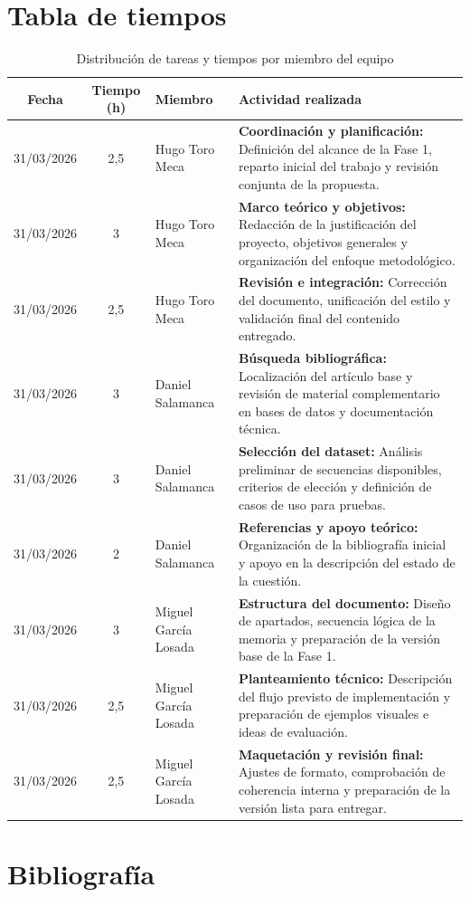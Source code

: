 \documentclass{article}
\begin{document}
\section{Tabla de tiempos}

\begin{table}[H] %
    \centering
    \small %
    \begin{tabular}{|c|c|l|p{8cm}|}
        \hline
        \textbf{Fecha} & \textbf{Tiempo (h)} & \textbf{Miembro} & \textbf{Actividad realizada} \\ \hline
        31/03/2026 & 2,5 & Hugo Toro Meca & \textbf{Coordinación y planificación:} Definición del alcance de la Fase 1, reparto inicial del trabajo y revisión conjunta de la propuesta. \\ \hline
        31/03/2026 & 3 & Hugo Toro Meca & \textbf{Marco teórico y objetivos:} Redacción de la justificación del proyecto, objetivos generales y organización del enfoque metodológico. \\ \hline
        31/03/2026 & 2,5 & Hugo Toro Meca & \textbf{Revisión e integración:} Corrección del documento, unificación del estilo y validación final del contenido entregado. \\ \hline
        31/03/2026 & 3 & Daniel Salamanca & \textbf{Búsqueda bibliográfica:} Localización del artículo base y revisión de material complementario en bases de datos y documentación técnica. \\ \hline
        31/03/2026 & 3 & Daniel Salamanca & \textbf{Selección del dataset:} Análisis preliminar de secuencias disponibles, criterios de elección y definición de casos de uso para pruebas. \\ \hline
        31/03/2026 & 2 & Daniel Salamanca & \textbf{Referencias y apoyo teórico:} Organización de la bibliografía inicial y apoyo en la descripción del estado de la cuestión. \\ \hline
        31/03/2026 & 3 & Miguel García Losada & \textbf{Estructura del documento:} Diseño de apartados, secuencia lógica de la memoria y preparación de la versión base de la Fase 1. \\ \hline
        31/03/2026 & 2,5 & Miguel García Losada & \textbf{Planteamiento técnico:} Descripción del flujo previsto de implementación y preparación de ejemplos visuales e ideas de evaluación. \\ \hline
        31/03/2026 & 2,5 & Miguel García Losada & \textbf{Maquetación y revisión final:} Ajustes de formato, comprobación de coherencia interna y preparación de la versión lista para entregar. \\ \hline
    \end{tabular}
    \caption{Distribución de tareas y tiempos por miembro del equipo}
    \label{tab:seguimiento_actividades}
\end{table}

\section{Bibliografía}
\nocite{*} 


\end{document}
